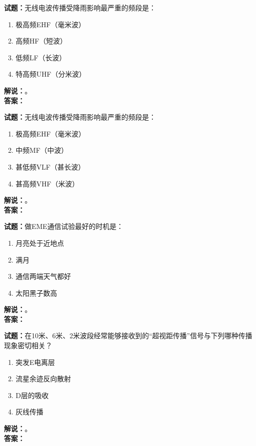 \documentclass{ctexbook}
\begin{document}
\bigskip

\noindent\textbf{试题：}无线电波传播受降雨影响最严重的频段是：
\begin{enumerate}[leftmargin=3em]
  \item 极高频EHF（毫米波）
  \item 高频HF（短波）
  \item 低频LF（长波）
  \item 特高频UHF（分米波）
\end{enumerate}
\noindent\textbf{解说：}\textbf{}。\\\noindent\textbf{答案：}

\bigskip

\noindent\textbf{试题：}无线电波传播受降雨影响最严重的频段是：
\begin{enumerate}[leftmargin=3em]
  \item 极高频EHF（毫米波）
  \item 中频MF（中波）
  \item 甚低频VLF（甚长波）
  \item 甚高频VHF（米波）
\end{enumerate}
\noindent\textbf{解说：}\textbf{}。\\\noindent\textbf{答案：}

\bigskip

\noindent\textbf{试题：}做EME通信试验最好的时机是：
\begin{enumerate}[leftmargin=3em]
  \item 月亮处于近地点
  \item 满月
  \item 通信两端天气都好
  \item 太阳黑子数高
\end{enumerate}
\noindent\textbf{解说：}\textbf{}。\\\noindent\textbf{答案：}

\bigskip

\noindent\textbf{试题：}在10米、6米、2米波段经常能够接收到的“超视距传播”信号与下列哪种传播现象密切相关？
\begin{enumerate}[leftmargin=3em]
  \item 突发E电离层
  \item 流星余迹反向散射
  \item D层的吸收
  \item 灰线传播
\end{enumerate}
\noindent\textbf{解说：}\textbf{}。\\\noindent\textbf{答案：}

\bigskip
\end{document}
